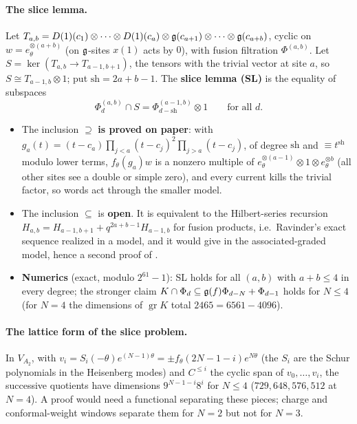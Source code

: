 \paragraph{The slice lemma.} Let $T_{a,b}=D(1)(c_1)\otimes\dots\otimes D(1)(c_a)\otimes\mathfrak g(c_{a+1})\otimes\dots\otimes\mathfrak g(c_{a+b})$,
cyclic on $w=e_\theta^{\otimes(a+b)}$ (on $\mathfrak g$-sites $x(1)$ acts by $0$), with fusion filtration $\Phi^{(a,b)}$. Let
$S=\ker(T_{a,b}\to T_{a-1,b+1})$, the tensors with the trivial vector at site $a$, so $S\cong T_{a-1,b}\otimes1$; put
$\mathrm{sh}=2a+b-1$. The \textbf{slice lemma (SL)} is the equality of subspaces
\begin{equation}\label{l26:eq:SL}
\Phi^{(a,b)}_d\cap S=\Phi^{(a-1,b)}_{d-\mathrm{sh}}\otimes1\qquad\text{for all }d .
\end{equation}
\begin{itemize}
\item The inclusion $\supseteq$ \textbf{is proved on paper}: with $g_a(t)=(t-c_a)\prod_{j<a}(t-c_j)^2\prod_{j>a}(t-c_j)$, of
  degree $\mathrm{sh}$ and $\equiv t^{\mathrm{sh}}$ modulo lower terms, $f_\theta(g_a)w$ is a nonzero multiple of
  $e_\theta^{\otimes(a-1)}\otimes1\otimes e_\theta^{\otimes b}$ (all other sites see a double or simple zero), and every current
  kills the trivial factor, so words act through the smaller model.
\item The inclusion $\subseteq$ is \textbf{open}. It is equivalent to the Hilbert-series recursion
  $H_{a,b}=H_{a-1,b+1}+q^{2a+b-1}H_{a-1,b}$ for fusion products, i.e.\ Ravinder's exact sequence realized in a model, and it would
  give  in the associated-graded model, hence a second proof of .
\item \textbf{Numerics} (exact, modulo $2^{61}-1$): SL holds for all $(a,b)$ with $a+b\le4$ in every degree; the stronger
  claim $K\cap\Phi_d\subseteq\mathfrak g(f)\Phi_{d-N}+\Phi_{d-1}$ holds for $N\le4$ (for $N=4$ the dimensions of
  $\operatorname{gr}K$ total $2465=6561-4096$).
\end{itemize}
\paragraph{The lattice form of the slice problem.} In $V_{A_2}$, with $v_i=S_i(-\theta)e^{(N-1)\theta}=\pm f_\theta(2N-1-i)e^{N\theta}$
(the $S_i$ are the Schur polynomials in the Heisenberg modes) and $C^{\le i}$ the cyclic span of $v_0,\dots,v_i$, the successive quotients have dimensions $9^{N-1-i}8^i$ for $N\le4$
($729,648,576,512$ at $N=4$). A proof would need a functional separating these pieces; charge and conformal-weight windows
separate them for $N=2$ but not for $N=3$.

